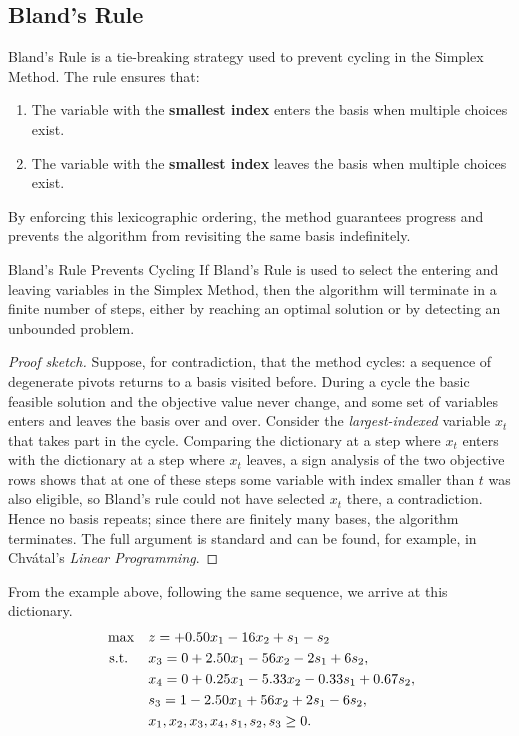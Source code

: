 \subsection{Bland's Rule}
Bland's Rule is a tie-breaking strategy used to prevent cycling in the Simplex Method. The rule ensures that:
\begin{enumerate}
    \item The variable with the \textbf{smallest index} enters the basis when multiple choices exist.
    \item The variable with the \textbf{smallest index} leaves the basis when multiple choices exist.
\end{enumerate}
By enforcing this lexicographic ordering, the method guarantees progress and prevents the algorithm from revisiting the same basis indefinitely.

\begin{theorem}{Bland's Rule Prevents Cycling}{}
If Bland's Rule is used to select the entering and leaving variables in the Simplex Method, then the algorithm will terminate in a finite number of steps, either by reaching an optimal solution or by detecting an unbounded problem.
\end{theorem}

\begin{proof}[Proof sketch]
Suppose, for contradiction, that the method cycles: a sequence of degenerate pivots returns to a basis visited before. During a cycle the basic feasible solution and the objective value never change, and some set of variables enters and leaves the basis over and over. Consider the \emph{largest-indexed} variable $x_t$ that takes part in the cycle. Comparing the dictionary at a step where $x_t$ enters with the dictionary at a step where $x_t$ leaves, a sign analysis of the two objective rows shows that at one of these steps some variable with index smaller than $t$ was also eligible, so Bland's rule could not have selected $x_t$ there, a contradiction. Hence no basis repeats; since there are finitely many bases, the algorithm terminates. The full argument is standard and can be found, for example, in Chv\'atal's \emph{Linear Programming}.
\end{proof}

From the example above, following the same sequence, we arrive at this dictionary.
\[
\begin{aligned}
\max \quad & z = +0.50x_1 - 16x_2 + s_1 - s_2 \\
\mbox{ s.t. } \quad 
& x_3 = 0 + 2.50x_1 - 56x_2 - 2s_1 + 6s_2, \\
& x_4 = 0 + 0.25x_1 - 5.33x_2 - 0.33s_1 + 0.67s_2, \\
& s_3 = 1 - 2.50x_1 + 56x_2 + 2s_1 - 6s_2, \\
& x_1, x_2, x_3, x_4, s_1, s_2, s_3 \geq 0.
\end{aligned}
\]

